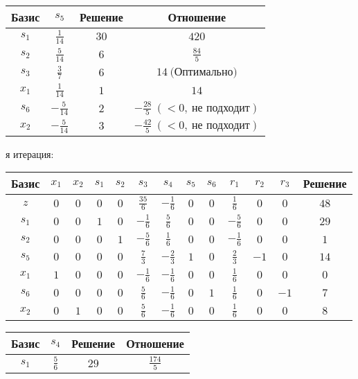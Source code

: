 \documentclass{article}%
\begin{document}
\begin{flushleft}
\begin{tabular}{|cccc|}
\hline%
Базис&$s_{5}$&Решение&Отношение\\%
\hline%
$s_{1}$&$\frac{1}{14}$&$30$&$420$\\%
$s_{2}$&$\frac{5}{14}$&$6$&$\frac{84}{5}$\\%
$s_{3}$&$\frac{3}{7}$&$6$&$14\: \text{(Оптимально)}$\\%
$x_{1}$&$\frac{1}{14}$&$1$&$14$\\%
$s_{6}$&$-\frac{5}{14}$&$2$&$-\frac{28}{5}\: (< 0, \: \text{не подходит})$\\%
$x_{2}$&$-\frac{5}{14}$&$3$&$-\frac{42}{5}\: (< 0, \: \text{не подходит})$\\%
\hline%
\end{tabular}%
\newline%
\newline%
я итерация: %
\newline%
\newline%
\renewcommand{\arraystretch}{1.3}%
\begin{tabular}{|c|ccccccccccc|c|}%
\hline%
Базис&$x_{1}$&$x_{2}$&$s_{1}$&$s_{2}$&$s_{3}$&$s_{4}$&$s_{5}$&$s_{6}$&$r_{1}$&$r_{2}$&$r_{3}$&Решение\\%
\hline%
$z$&$0$&$0$&$0$&$0$&$\frac{35}{6}$&$-\frac{1}{6}$&$0$&$0$&$\frac{1}{6}$&$0$&$0$&$48$\\%
\hline%
$s_{1}$&$0$&$0$&$1$&$0$&$-\frac{1}{6}$&$\frac{5}{6}$&$0$&$0$&$-\frac{5}{6}$&$0$&$0$&$29$\\%
$s_{2}$&$0$&$0$&$0$&$1$&$-\frac{5}{6}$&$\frac{1}{6}$&$0$&$0$&$-\frac{1}{6}$&$0$&$0$&$1$\\%
$s_{5}$&$0$&$0$&$0$&$0$&$\frac{7}{3}$&$-\frac{2}{3}$&$1$&$0$&$\frac{2}{3}$&$-1$&$0$&$14$\\%
$x_{1}$&$1$&$0$&$0$&$0$&$-\frac{1}{6}$&$-\frac{1}{6}$&$0$&$0$&$\frac{1}{6}$&$0$&$0$&$0$\\%
$s_{6}$&$0$&$0$&$0$&$0$&$\frac{5}{6}$&$-\frac{1}{6}$&$0$&$1$&$\frac{1}{6}$&$0$&$-1$&$7$\\%
$x_{2}$&$0$&$1$&$0$&$0$&$\frac{5}{6}$&$-\frac{1}{6}$&$0$&$0$&$\frac{1}{6}$&$0$&$0$&$8$\\%
\hline%
\end{tabular}%
\newline%
\newline%
\newline%
\begin{tabular}{|cccc|}%
\hline%
Базис&$s_{4}$&Решение&Отношение\\%
\hline%
$s_{1}$&$\frac{5}{6}$&$29$&$\frac{174}{5}$\\%

\end{tabular}
\end{flushleft}
\end{document}
